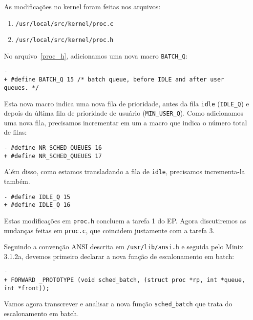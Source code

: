 \documentclass{amsart}
\theoremstyle{plain}
\newcommand{\code}[1]{\lstinline[mathescape=true]{#1}}
\begin{document}
As modificações no kernel foram feitas nos arquivos:

\begin{enumerate}
  \item\label{proc_c} \code{/usr/local/src/kernel/proc.c}
  \item\label{proc_h} \code{/usr/local/src/kernel/proc.h}
\end{enumerate}

No arquivo~\ref{proc_h}, adicionamos uma nova macro \code{BATCH_Q}:

\begin{lstlisting}[frame=leftline,mathescape=true,style=nonumbers]
-
+ #define BATCH_Q 15 /* batch queue, before IDLE and after user queues. */
\end{lstlisting}

Esta nova macro indica uma nova fila de prioridade, antes da fila \code{idle} (\code{IDLE_Q}) e
depois da última fila de prioridade de usuário (\code{MIN_USER_Q}). Como adicionamos uma nova fila,
precisamos incrementar em um a macro que indica o número total de filas:

\begin{lstlisting}[frame=leftline,mathescape=true,style=nonumbers]
- #define NR_SCHED_QUEUES 16
+ #define NR_SCHED_QUEUES 17
\end{lstlisting}

Além disso, como estamos transladando a fila de \code{idle}, precisamos incrementa-la também.

\begin{lstlisting}[frame=leftline,mathescape=true,style=nonumbers]
- #define IDLE_Q 15
+ #define IDLE_Q 16
\end{lstlisting}

Estas modificações em \code{proc.h} concluem a tarefa 1 do EP\@. Agora discutiremos as mudanças
feitas em \code{proc.c}, que coincidem justamente com a tarefa 3.

Seguindo a convenção ANSI descrita em \code{/usr/lib/ansi.h} e seguida pelo Minix 3.1.2a, devemos
primeiro declarar a nova função de escalonamento em batch:

\begin{lstlisting}[frame=leftline,mathescape=true,style=nonumbers]
-
+ FORWARD _PROTOTYPE (void sched_batch, (struct proc *rp, int *queue, int *front));
\end{lstlisting}

Vamos agora transcrever e analisar a nova função \code{sched_batch} que trata do escalonamento em
batch.
\newpage
\end{document}
